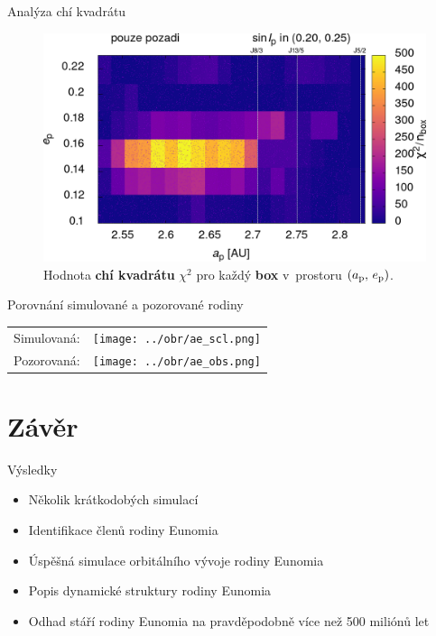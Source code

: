 \documentclass[xcolor=dvipsnames]{beamer}
\begin{document}
\begin{frame}[t]{\secname}{Analýza chí kvadrátu}
\begin{figure}
		\includegraphics[width=0.41\paperwidth]{../obr/ae_chi_emptyt.png}

		\caption{Hodnota \textbf{chí kvadrátu} $\chi^2$ pro každý \textbf{box} v~prostoru $(a_{\rm p},\,e_{\rm p})$.} \label{fig:ae_chi2}
	\end{figure}

\end{frame}

\begin{frame}[t]{\secname}{Porovnání simulované a pozorované rodiny}
	\begin{tabularx}{\textwidth}{c V}
		\centering
		Simulovaná: & \texttt{[image: ../obr/ae\_scl.png]}\\
		Pozorovaná: & \texttt{[image: ../obr/ae\_obs.png]}
	\end{tabularx}
\end{frame}


\section{Závěr}


\begin{frame}[t]{\secname}{Výsledky}
	\begin{itemize}
	\item Několik krátkodobých simulací %
	\item Identifikace členů rodiny Eunomia
	\item Úspěšná simulace orbitálního vývoje rodiny Eunomia
	\item Popis dynamické struktury rodiny Eunomia
	\item Odhad stáří rodiny Eunomia na pravděpodobně více než 500 miliónů let
	\end{itemize}
\end{frame}
\end{document}
